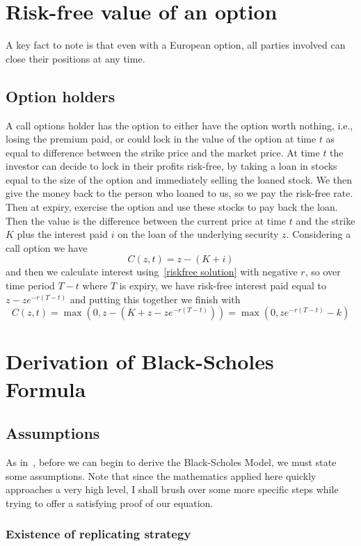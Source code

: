\documentclass[11pt]{article} %
\begin{document}
\printbibliography%

\appendix

\section{Risk-free value of an option}
A key fact to note is that even with a 
European option, all parties involved can close their positions at any time. 
\subsection*{Option holders}
A call options holder has the option to either have the option worth nothing, i.e., 
losing the premium paid, or could lock in the value of the option at time $t$ as 
equal to difference between the strike price and the market price. At time $t$ the 
investor can decide to lock in their profits risk-free, by taking a loan in stocks 
equal to the size of the option and immediately selling the loaned stock. We then give 
the money back to the person who loaned to us, so we pay the risk-free rate. Then at 
expiry, exercise the option and use these stocks to pay back the loan. Then the value is 
the difference between the current price at time $t$ and the strike $K$ plus the 
interest paid $i$ on the loan of the underlying security 
$z$. Considering a call option we have 
 \[C(z,t) = z - (K + i)\]
 and then we calculate interest using~\eqref{riskfree solution} with negative $r$, so 
 over time period $T-t$ where $T$ is expiry, we have risk-free interest paid equal to 
 $z - ze^{-r(T-t)}$ 
 and putting this together we finish with 
 \[
C(z,t) =\max{(0, z - (K + z - ze^{-r(T-t)}))} = \max{(0, ze^{-r(T-t)} - k)}
 \]

\section{Derivation of Black-Scholes Formula}\label{blackScholesAppendix}
\subsection{Assumptions}

As in~\cite{blackscholes}, before we can begin to derive the Black-Scholes Model, we must 
state some assumptions. Note that since the mathematics applied here quickly approaches a 
very high level, I shall brush over some more specific steps while trying to offer a 
satisfying proof of our equation.
\subsubsection{Existence of replicating strategy}\label{replicatingstrategy}
\end{document}
